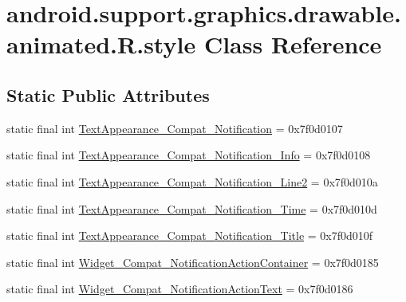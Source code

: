 \hypertarget{classandroid_1_1support_1_1graphics_1_1drawable_1_1animated_1_1R_1_1style}{}\section{android.\+support.\+graphics.\+drawable.\+animated.\+R.\+style Class Reference}
\label{classandroid_1_1support_1_1graphics_1_1drawable_1_1animated_1_1R_1_1style}
\subsection*{Static Public Attributes}
\begin{DoxyCompactItemize}
\item 
static final int \mbox{\hyperlink{classandroid_1_1support_1_1graphics_1_1drawable_1_1animated_1_1R_1_1style_a5fbf409dd199cb4a5f5e0dd365563637}{Text\+Appearance\+\_\+\+Compat\+\_\+\+Notification}} = 0x7f0d0107
\item 
static final int \mbox{\hyperlink{classandroid_1_1support_1_1graphics_1_1drawable_1_1animated_1_1R_1_1style_a9888e3ca28c5c922d8191265537cdee0}{Text\+Appearance\+\_\+\+Compat\+\_\+\+Notification\+\_\+\+Info}} = 0x7f0d0108
\item 
static final int \mbox{\hyperlink{classandroid_1_1support_1_1graphics_1_1drawable_1_1animated_1_1R_1_1style_acc09f6bec13b1b6d745cc94d33c60718}{Text\+Appearance\+\_\+\+Compat\+\_\+\+Notification\+\_\+\+Line2}} = 0x7f0d010a
\item 
static final int \mbox{\hyperlink{classandroid_1_1support_1_1graphics_1_1drawable_1_1animated_1_1R_1_1style_ad9a14440bdc4d883c4c8168134762062}{Text\+Appearance\+\_\+\+Compat\+\_\+\+Notification\+\_\+\+Time}} = 0x7f0d010d
\item 
static final int \mbox{\hyperlink{classandroid_1_1support_1_1graphics_1_1drawable_1_1animated_1_1R_1_1style_a0daa87e285ed4fa5a17e16b5344ba6f2}{Text\+Appearance\+\_\+\+Compat\+\_\+\+Notification\+\_\+\+Title}} = 0x7f0d010f
\item 
static final int \mbox{\hyperlink{classandroid_1_1support_1_1graphics_1_1drawable_1_1animated_1_1R_1_1style_a00f50b1fa159647522db8b2b82ada84b}{Widget\+\_\+\+Compat\+\_\+\+Notification\+Action\+Container}} = 0x7f0d0185
\item 
static final int \mbox{\hyperlink{classandroid_1_1support_1_1graphics_1_1drawable_1_1animated_1_1R_1_1style_ace24247cc6875b00f9146446714a1736}{Widget\+\_\+\+Compat\+\_\+\+Notification\+Action\+Text}} = 0x7f0d0186
\end{DoxyCompactItemize}


